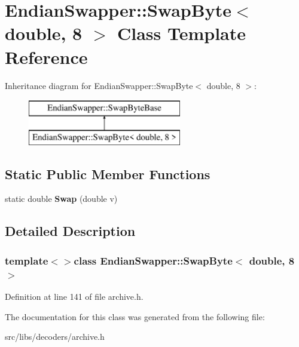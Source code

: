 \hypertarget{classEndianSwapper_1_1SwapByte_3_01double_00_018_01_4}{\section{Endian\-Swapper\-:\-:Swap\-Byte$<$ double, 8 $>$ Class Template Reference}
\label{classEndianSwapper_1_1SwapByte_3_01double_00_018_01_4}
}
Inheritance diagram for Endian\-Swapper\-:\-:Swap\-Byte$<$ double, 8 $>$\-:\begin{figure}[H]
\begin{center}
\leavevmode
\includegraphics[height=2.000000cm]{classEndianSwapper_1_1SwapByte_3_01double_00_018_01_4}
\end{center}
\end{figure}
\subsection*{Static Public Member Functions}
\begin{DoxyCompactItemize}
\item 
\hypertarget{classEndianSwapper_1_1SwapByte_3_01double_00_018_01_4_a21ec1c983ec393eca5c917d2936db554}{static double {\bfseries Swap} (double v)}\label{classEndianSwapper_1_1SwapByte_3_01double_00_018_01_4_a21ec1c983ec393eca5c917d2936db554}

\end{DoxyCompactItemize}


\subsection{Detailed Description}
\subsubsection*{template$<$$>$class Endian\-Swapper\-::\-Swap\-Byte$<$ double, 8 $>$}



Definition at line 141 of file archive.\-h.



The documentation for this class was generated from the following file\-:\begin{DoxyCompactItemize}
\item 
src/libs/decoders/archive.\-h\end{DoxyCompactItemize}
